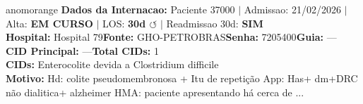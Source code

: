 \documentclass[a4paper,10pt]{article}
\begin{document}
\begin{anomalycard}[Internacao 166442 | GHO-PETROBRAS | ALTO (z=3.71)]{anomorange}
\textbf{Dados da Internacao:} Paciente 37000 $\mid$ Admissao: 21/02/2026 $\mid$ Alta: \textcolor{anomorange}{\textbf{EM CURSO}} $\mid$ LOS: \textbf{30d \textcolor{anomorange}{$\circlearrowleft$}} $\mid$ Readmissao 30d: \textcolor{anomred}{\textbf{SIM}}\\
\textbf{Hospital:} Hospital 79\quad\textbf{Fonte:} GHO-PETROBRAS\quad\textbf{Senha:} 7205400\quad\textbf{Guia:} ---\\
\textbf{CID Principal:} {\small ---}\quad\textbf{Total CIDs:} 1\\

\textbf{CIDs:} {\scriptsize Enterocolite devida a Clostridium difficile}\\

\textbf{Motivo:} {\scriptsize Hd: colite pseudomembronosa + Itu de repetição App: Has+ dm+DRC não dialitica+ alzheimer HMA: paciente apresentando há cerca de ...}\\


\end{anomalycard}
\end{document}
